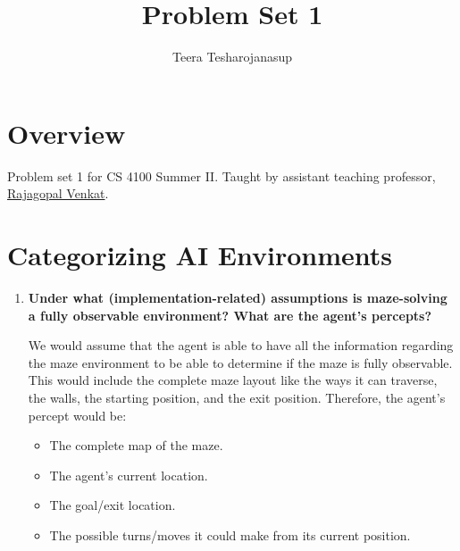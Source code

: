 \documentclass[a4paper]{article}
\begin{document}
\title{\textbf{\huge{Problem Set 1}}}

\author{\textbf\large{Teera Tesharojanasup}}


\date{}

\maketitle
\begin{sloppypar}

\section*{Overview}

Problem set 1 for CS 4100 Summer II. Taught by assistant teaching professor, \href{https://rajagopalvenkat.com/}{Rajagopal Venkat}. \cite{MISC:1}

\section{Categorizing AI Environments}

\begin{enumerate}[start=1,label=Q\arabic*,left=0pt]
    \item \textbf{Under what (implementation-related) assumptions is maze-solving a fully observable environment? What are the agent’s percepts?}
    \par We would assume that the agent is able to have all the information regarding the maze environment to be able to determine if the maze
    is fully observable. 
    This would include the complete maze layout like the ways it can traverse, the walls, the starting position, and the exit position.
    Therefore, the agent's percept would be:
    \begin{itemize}
        \item The complete map of the maze.
        \item The agent's current location.
        \item The goal/exit location.
        \item The possible turns/moves it could make from its current position.
    \end{itemize}
    

\end{enumerate}
\end{sloppypar}
\end{document}
